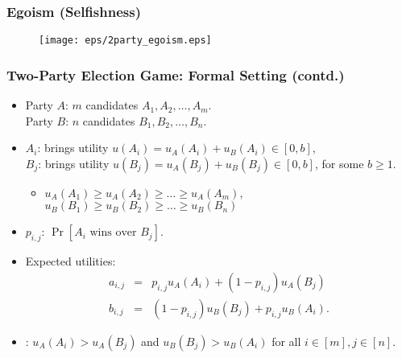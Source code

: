 \documentclass[xcolor=dvipsnames,envcountsect]{beamer}
\begin{document}
\begin{frame}
	\frametitle{Egoism (Selfishness)}
	\begin{figure}
		\begin{center}
			\texttt{[image: eps/2party\_egoism.eps]}
		\end{center}
	\end{figure}
\end{frame}


\begin{frame}
	\frametitle{Two-Party Election Game: Formal Setting (contd.)}
	\begin{itemize}
		\item Party $A$: $m$ candidates $A_1,A_2,\ldots,A_m$. \\Party $B$: $n$ candidates $B_1,B_2,\ldots,B_n$.
		\vspace{8pt}
		\item $A_i$: brings utility $u(A_i) = u_A(A_i) + u_B(A_i) \in [0,b]$,  \\$B_j$: brings utility $u(B_j) = u_A(B_j) + u_B(B_j) \in [0,b]$, for some $b\geq 1$. 
		\begin{itemize}
			\item $u_A(A_1)\geq u_A(A_2)\geq \ldots \geq u_A(A_m)$,  $u_B(B_1)\geq u_B(B_2)\geq \ldots \geq u_B(B_n)$
		\end{itemize}
		\vspace{5pt}
		\item $p_{i,j}$: $\Pr[A_i \mbox{ wins over } B_j]$. 
		\vspace{5pt}
		\item Expected utilities:
		\vspace{-7pt}
		\begin{eqnarray*}
			a_{i,j} &=& p_{i,j}u_A(A_i) + (1-p_{i,j})u_A(B_j)\\
			b_{i,j} &=& (1-p_{i,j})u_B(B_j) + p_{i,j}u_B(A_i).
		\end{eqnarray*} 
		\item {}: $u_A(A_i)> u_A(B_j)$ and $u_B(B_j)> u_B(A_i)$ for all $i\in [m], j\in [n]$.
	\end{itemize}
\end{frame}
\end{document}
